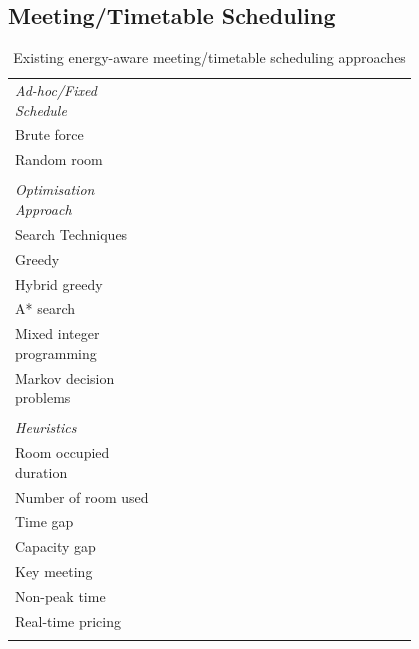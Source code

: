 \subsection{Meeting/Timetable Scheduling}

\begin{table}[t]
\centering
\begin{tabular}{p{0.3\linewidth} p{0.1\linewidth} p{0.08\linewidth}  p{0.08\linewidth} p{0.08\linewidth} p{0.08\linewidth} p{0.08\linewidth}}
\hline\centering{ } & \centering{\cite{majumdar2012energy}} & \centering{\cite{kwak2013tesla}} & \centering{\cite{pan2012thermal}} & \centering{\cite{klein2012coordinating}}  & \centering{\cite{chai2014minimizing}} & \centering{\cite{balaji2013zonepac}}\tabularnewline
\hline  \emph{Ad-hoc/Fixed Schedule} &  &  &  &  &  &  \tabularnewline
\hline  Brute force & \centering{x} &  &  &  &  &  \tabularnewline
\hline  Random room & \centering{x} &  &  & \centering{x} & \centering{x} & \centering{x} \tabularnewline
\hline   &  &  &  &  &  &  \tabularnewline
\hline  \emph{Optimisation Approach} &  &  &  &  &  &  \tabularnewline
\hline  Search Techniques &  &  &  &  &  &  \tabularnewline
\hline  \hspace{5pt} Greedy &  &  & \centering{x} &  &  &  \tabularnewline
\hline  \hspace{5pt} Hybrid greedy & \centering{x} &  &  &  &  &  \tabularnewline
\hline  A* search & \centering{x} &  &  &  &  &  \tabularnewline
\hline  Mixed integer programming &  & \centering{x} &  &  & \centering{x} &  \tabularnewline
\hline  Markov decision problems &  &  &  & \centering{x} &  &  \tabularnewline
\hline   &  &  &  &  &  &  \tabularnewline
\hline  \emph{Heuristics} &  &  &  &  &  &  \tabularnewline
\hline  Room occupied duration & \centering{x} &  &  &  &  &  \tabularnewline
\hline  Number of room used & \centering{x} &  &  & \centering{x} &  &  \tabularnewline
\hline  Time gap & \centering{x} &  & \centering{x} &  & \centering{x} &  \tabularnewline
\hline  Capacity gap & \centering{x} & \centering{x} & \centering{x} &  & \centering{x} &  \tabularnewline
\hline  Key meeting &  & \centering{x} &  &  &  &  \tabularnewline
\hline  Non-peak time &  & \centering{x} &  &  & &  \tabularnewline
\hline  Real-time pricing &  &  & \centering{x} &  & \centering{x} &  \tabularnewline
\hline   &  &  &  &  &  &  \tabularnewline
\end{tabular}
	\caption{Existing energy-aware meeting/timetable scheduling approaches}
	\label{tab:sche_appr}
\end{table}

